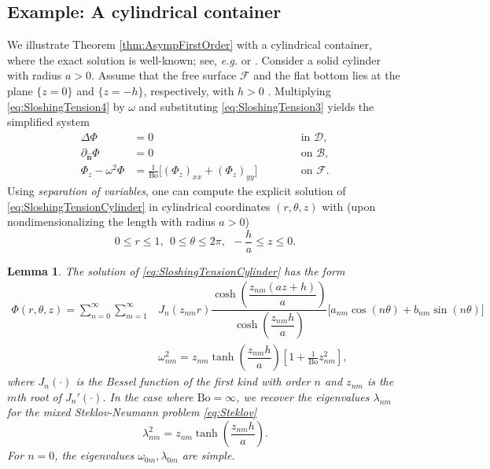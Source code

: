 \documentclass[letterpaper, 12pt]{amsart}
\newtheorem{lemma}[definition]{Lemma}
\newcommand{\bond}{\mathrm{Bo}}
\newcommand{\D}{\mathcal{D}}
\newcommand{\B}{\mathcal{B}}
\newcommand{\F}{\mathcal{F}}
\newcommand{\n}{\mathbf{\hat{n}}}
\begin{document}
\subsection*{Example: A cylindrical container}
We illustrate Theorem \ref{thm:AsympFirstOrder} with a cylindrical container, where the exact solution is well-known; see, {\it e.g.} \cite[pp.764]{Ibrahim:2005aa} or \cite[pp.415]{Reynolds:1966aa}. Consider a solid cylinder with radius $a>0$. Assume that the free surface $\F$ and the flat bottom lies at the plane $\{z=0\}$ and $\{z=-h\}$, respectively, with $h>0$ . Multiplying \eqref{eq:SloshingTension4} by $\omega$ and substituting \eqref{eq:SloshingTension3} yields the simplified system
\begin{subequations}\label{eq:SloshingTensionCylinder}
\begin{alignat}{2}
\Delta\Phi & = 0 && \qquad\textrm{ in }\D, \\
\partial_\n\Phi & = 0 && \qquad\textrm{ on }\B, \\
\Phi_z - \omega^2\Phi & = \frac{1}{\bond}\Big[(\Phi_z)_{xx} + (\Phi_z)_{yy}\Big] && \qquad\textrm{ on }\F.
\end{alignat}
\end{subequations}
Using \emph{separation of variables}, one can compute the explicit solution of \eqref{eq:SloshingTensionCylinder}  in cylindrical coordinates $(r,\theta,z)$ with (upon nondimensionalizing the length with radius $a>0$)
\[ 0\le r\le 1, \ \ 0\le\theta\le 2\pi, \ \ -\frac{h}{a}\le z\le 0. \]


\begin{lemma}
The solution of \eqref{eq:SloshingTensionCylinder} has the form
\begin{subequations}
\begin{align}
\Phi(r,\theta,z) = \sum_{n=0}^\infty\sum_{m=1}^\infty & J_n\left(z_{nm}r\right)\dfrac{\cosh\left(\dfrac{z_{nm}(az+h)}{a}\right)}{\cosh\left(\dfrac{z_{nm}h}{a}\right)}\Big[a_{nm}\cos(n\theta) + b_{nm}\sin(n\theta)\Big] \label{eq:cylinder1}\\
& \omega_{nm}^2= z_{nm}\tanh\left(\dfrac{z_{nm}h}{a}\right)\left[1+\frac{1}{\bond}z_{nm}^2\right], \label{eq:cylinder2}
\end{align}
\end{subequations}
where $J_n(\cdot)$ is the Bessel function of the first kind with order $n$ and $z_{nm}$ is the $m$th root of $J_n'(\cdot)$. In the case where $\bond=\infty$, we recover the eigenvalues $\lambda_{nm}$ for the mixed Steklov-Neumann problem \eqref{eq:Steklov}
\begin{equation}
\lambda_{nm}^2 = z_{nm}\tanh\left(\frac{z_{nm}h}{a}\right). \label{eq:cylinder3}
\end{equation}
For $n=0$, the eigenvalues $\omega_{0m}, \lambda_{0m}$ are simple. 
\end{lemma}
\end{document}
